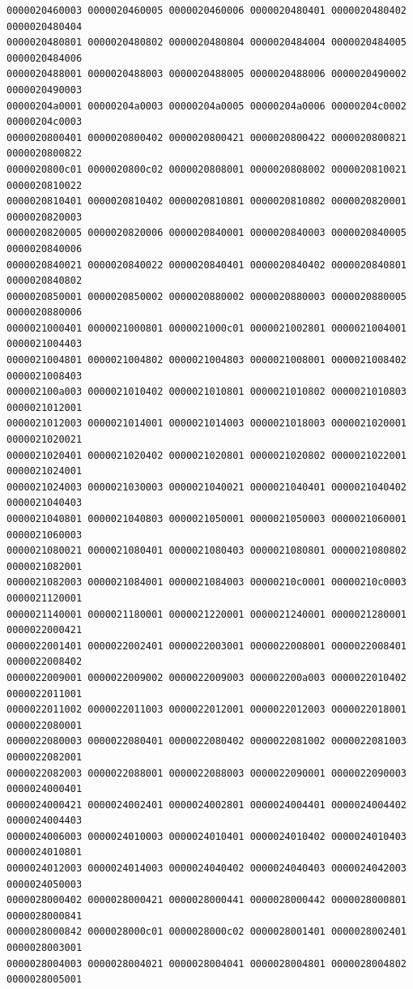 \begin{Verbatim}[fontsize=\scriptsize]
0000020460003 0000020460005 0000020460006 0000020480401 0000020480402 0000020480404
0000020480801 0000020480802 0000020480804 0000020484004 0000020484005 0000020484006
0000020488001 0000020488003 0000020488005 0000020488006 0000020490002 0000020490003
00000204a0001 00000204a0003 00000204a0005 00000204a0006 00000204c0002 00000204c0003
0000020800401 0000020800402 0000020800421 0000020800422 0000020800821 0000020800822
0000020800c01 0000020800c02 0000020808001 0000020808002 0000020810021 0000020810022
0000020810401 0000020810402 0000020810801 0000020810802 0000020820001 0000020820003
0000020820005 0000020820006 0000020840001 0000020840003 0000020840005 0000020840006
0000020840021 0000020840022 0000020840401 0000020840402 0000020840801 0000020840802
0000020850001 0000020850002 0000020880002 0000020880003 0000020880005 0000020880006
0000021000401 0000021000801 0000021000c01 0000021002801 0000021004001 0000021004403
0000021004801 0000021004802 0000021004803 0000021008001 0000021008402 0000021008403
000002100a003 0000021010402 0000021010801 0000021010802 0000021010803 0000021012001
0000021012003 0000021014001 0000021014003 0000021018003 0000021020001 0000021020021
0000021020401 0000021020402 0000021020801 0000021020802 0000021022001 0000021024001
0000021024003 0000021030003 0000021040021 0000021040401 0000021040402 0000021040403
0000021040801 0000021040803 0000021050001 0000021050003 0000021060001 0000021060003
0000021080021 0000021080401 0000021080403 0000021080801 0000021080802 0000021082001
0000021082003 0000021084001 0000021084003 00000210c0001 00000210c0003 0000021120001
0000021140001 0000021180001 0000021220001 0000021240001 0000021280001 0000022000421
0000022001401 0000022002401 0000022003001 0000022008001 0000022008401 0000022008402
0000022009001 0000022009002 0000022009003 000002200a003 0000022010402 0000022011001
0000022011002 0000022011003 0000022012001 0000022012003 0000022018001 0000022080001
0000022080003 0000022080401 0000022080402 0000022081002 0000022081003 0000022082001
0000022082003 0000022088001 0000022088003 0000022090001 0000022090003 0000024000401
0000024000421 0000024002401 0000024002801 0000024004401 0000024004402 0000024004403
0000024006003 0000024010003 0000024010401 0000024010402 0000024010403 0000024010801
0000024012003 0000024014003 0000024040402 0000024040403 0000024042003 0000024050003
0000028000402 0000028000421 0000028000441 0000028000442 0000028000801 0000028000841
0000028000842 0000028000c01 0000028000c02 0000028001401 0000028002401 0000028003001
0000028004003 0000028004021 0000028004041 0000028004801 0000028004802 0000028005001

\end{Verbatim}
